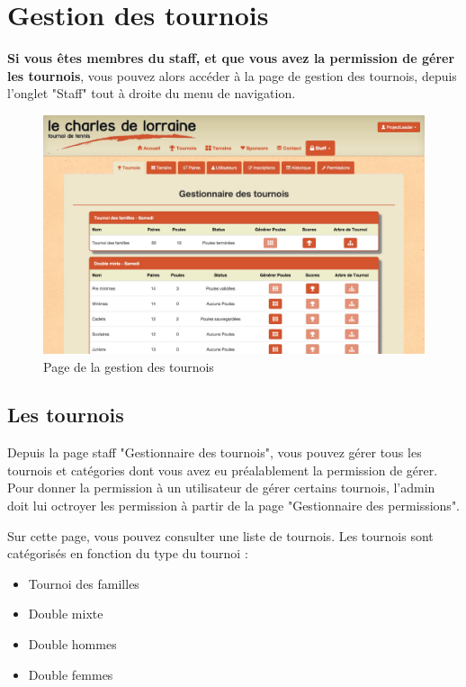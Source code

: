 \section{Gestion des tournois}

\textbf{Si vous êtes membres du staff, et que vous avez la permission de gérer les tournois}, vous pouvez alors accéder à la page de gestion des tournois, depuis l'onglet "Staff" tout à droite du menu de navigation.

\begin{figure}[H]
\centering
\includegraphics[scale=0.15]{gestion-tournois/gestion-tournois.jpg}
\caption{Page de la gestion des tournois}
\end{figure}

\subsection{Les tournois}

Depuis la page staff "Gestionnaire des tournois", vous pouvez gérer tous les tournois et catégories dont vous avez eu préalablement la permission de gérer. Pour donner la permission à un utilisateur de gérer certains tournois, l'admin doit lui octroyer les permission à partir de la page "Gestionnaire des permissions".

Sur cette page, vous pouvez consulter une liste de tournois. Les tournois sont catégorisés en fonction du type du tournoi :

\begin{itemize}
\item Tournoi des familles
\item Double mixte
\item Double hommes
\item Double femmes
\end{itemize}

